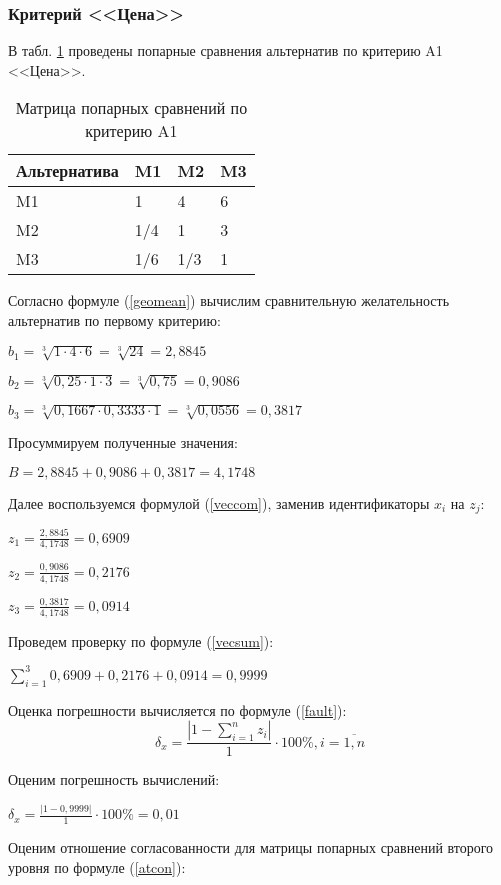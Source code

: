 \subsubsection{Критерий <<Цена>>}

В табл. \ref{cost} проведены попарные сравнения альтернатив по критерию A1 <<Цена>>.
\begin{table}[H]
  \caption{Матрица попарных сравнений по критерию A1}\label{cost}
  \begin{tabular}{|l|l|l|l|}
  \hline Альтернатива & M1 & M2 & M3 \\
  \hline M1 & 1 & 4 & 6 \\
  \hline M2 & 1/4 & 1 & 3 \\
  \hline M3 & 1/6 & 1/3 & 1 \\
  \hline
  \end{tabular}
\end{table}

Согласно формуле (\ref{geomean}) вычислим сравнительную желательность альтернатив по первому критерию:

$b_1 = \sqrt[3]{1 \cdot 4 \cdot 6} = \sqrt[3]{24} = 2,8845$

$b_2 = \sqrt[3]{0,25 \cdot 1 \cdot 3} = \sqrt[3]{0,75} = 0,9086$

$b_3 = \sqrt[3]{0,1667 \cdot 0,3333 \cdot 1} = \sqrt[3]{0,0556} = 0,3817$

Просуммируем полученные значения:

$B = 2,8845 + 0,9086 + 0,3817 = 4,1748$

Далее воспользуемся формулой (\ref{veccom}), заменив идентификаторы $x_i$ на $z_j$:

$z_1 = \frac{2,8845}{4,1748} = 0,6909$

$z_2 = \frac{0,9086}{4,1748} = 0,2176$

$z_3 = \frac{0,3817}{4,1748} = 0,0914$

Проведем проверку по формуле (\ref{vecsum}):

$\sum_{i=1}^{3} 0,6909 + 0,2176 + 0,0914 = 0,9999$

Оценка погрешности вычисляется по формуле (\ref{fault}):
\begin{equation}\label{fault}
\delta_{x} = \frac{|1 - \sum_{i=1}^{n} z_i|}{1} \cdot 100\%, i = \overline{1,n}
\end{equation}

Оценим погрешность вычислений:

$\delta_{x} = \frac{|1 - 0,9999|}{1} \cdot 100\% = 0,01$

Оценим отношение согласованности для матрицы попарных сравнений второго уровня по формуле (\ref{atcon}):

